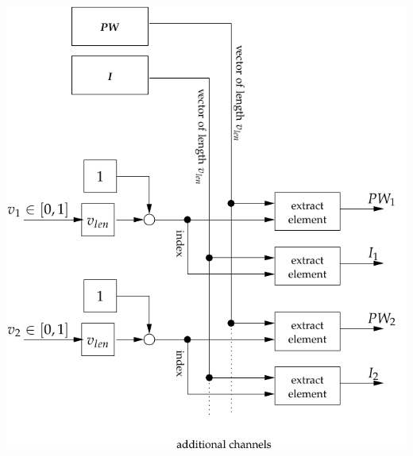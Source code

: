 \documentclass[serif,9pt,xcolor=dvipsnames]{beamer}
\begin{document}
\begin{frame}[fragile]
{     \begin{minipage}{0.55\linewidth}
\hspace{-1.8cm}
\vspace{2cm}
	\centering \includegraphics[width=1.0\linewidth]{figures/charge_control.pdf} 

     \end{minipage}    
  }

\end{frame}
\end{document}
